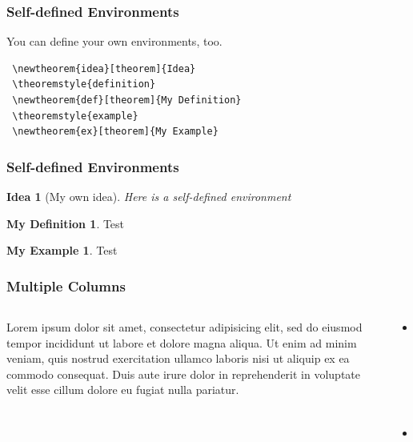 \documentclass[aspectratio=169]{beamer}
\begin{document}
\begin{frame}[fragile]
\frametitle{Self-defined Environments}

\newtheorem{idea}[theorem]{Idea}
\theoremstyle{definition}
\newtheorem{defi}[theorem]{My Definition}
\theoremstyle{example}
\newtheorem{ex}[theorem]{My Example}

 You can define your own environments, too.
\begin{verbatim}
 \newtheorem{idea}[theorem]{Idea}
 \theoremstyle{definition}
 \newtheorem{def}[theorem]{My Definition}
 \theoremstyle{example}
 \newtheorem{ex}[theorem]{My Example}
\end{verbatim}
 
\end{frame}

\begin{frame}[fragile]
\frametitle{Self-defined Environments}

\begin{idea}[My own idea]
 Here is a self-defined environment
\end{idea}

\begin{defi}
 Test
\end{defi}

\begin{ex}
 Test
\end{ex}
\end{frame}




\begin{frame}
\frametitle{Multiple Columns}

\begin{columns}
\begin{column}{.45\textwidth}
		Lorem ipsum dolor sit amet, consectetur adipisicing elit, sed do eiusmod
		tempor incididunt ut labore et dolore magna aliqua. Ut enim ad minim veniam,
		quis nostrud exercitation ullamco laboris nisi ut aliquip ex ea commodo
		consequat. Duis aute irure dolor in reprehenderit in voluptate velit esse
		cillum dolore eu fugiat nulla pariatur.
\end{column}
\begin{column}{.45\textwidth}
		\begin{itemize}
        	\item Point 1
        	\item Point 2
		\end{itemize}
	\end{column}
	\end{columns}
\end{frame}
\end{document}
